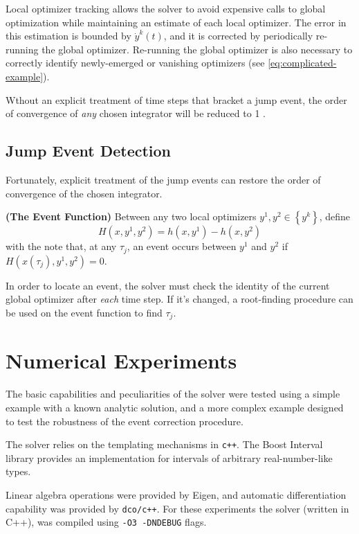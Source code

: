 \documentclass[twoside,leqno, twocolumn]{article}
\begin{document}
Local optimizer tracking allows the solver to avoid expensive calls to global optimization while maintaining an estimate of each local optimizer. The error in this estimation is bounded by $\dot y^k(t)$, and it is corrected by periodically re-running the global optimizer. Re-running the global optimizer is also necessary to correctly identify newly-emerged or vanishing optimizers (see \eqref{eq:complicated-example}).  

Wthout an explicit treatment of time steps that bracket a jump event, the order of convergence of \textit{any} chosen integrator will be reduced to 1 \cite{mannshardtOnestepMethodsAny1978}.

\subsection{Jump Event Detection}

Fortunately, explicit treatment of the jump events can restore the order of convergence of the chosen integrator.
\begin{Definition}
	\label{def:event-fn}
	\textbf{(The Event Function)}
	Between any two local optimizers $y^1, y^2 \in \left\{y^k\right\}$, define
	\begin{equation*}
		H(x, y^1, y^2) = h(x, y^1) - h(x, y^2)
	\end{equation*}
	with the note that, at any $\tau_j$, an event occurs between $y^1$ and $y^2$ if $H\left(x(\tau_j), y^1, y^2\right) = 0$.
\end{Definition}
In order to locate an event, the solver must check the identity of the current global optimizer after \textit{each} time step. If it's changed, a root-finding procedure can be used on the event function to find $\tau_j$.


\section{Numerical Experiments}
\label{section:numerical-experiments}
The basic capabilities and peculiarities of the solver were tested using a simple example with a known analytic solution, and a more complex example designed to test the robustness of the event correction procedure. 

The solver relies on the templating mechanisms in \texttt{c++}. The Boost Interval library \cite{melquiondBoostIntervalLibrary2022} provides an implementation for intervals of arbitrary real-number-like types.

Linear algebra operations were provided by Eigen\cite{guennebaudEigenV32010}, and automatic differentiation capability was provided by \texttt{dco/c++}\cite{leppkesDerivativeCodeOverloading2016}. For these experiments the solver (written in C++), was compiled using \texttt{-O3 -DNDEBUG} flags.
\end{document}
